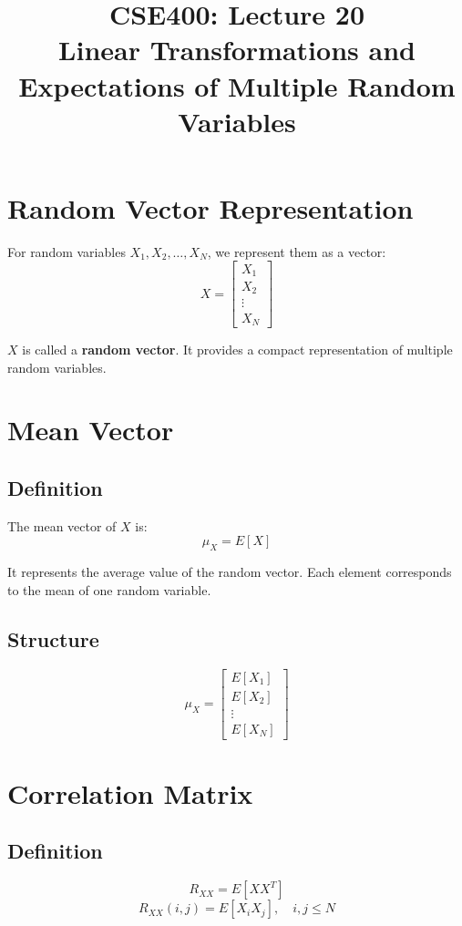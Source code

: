 \documentclass[12pt]{article}
\title{CSE400: Lecture 20 \\ Linear Transformations and Expectations of Multiple Random Variables}
\author{}
\date{}
\begin{document}
\maketitle

\section{Random Vector Representation}

For random variables $X_1, X_2, \ldots, X_N$, we represent them as a vector:
\[
X =
\begin{bmatrix}
X_1 \\
X_2 \\
\vdots \\
X_N
\end{bmatrix}
\]

$X$ is called a \textbf{random vector}. It provides a compact representation of multiple random variables.

\section{Mean Vector}

\subsection{Definition}
The mean vector of $X$ is:
\[
\mu_X = E[X]
\]

It represents the average value of the random vector. Each element corresponds to the mean of one random variable.

\subsection{Structure}
\[
\mu_X =
\begin{bmatrix}
E[X_1] \\
E[X_2] \\
\vdots \\
E[X_N]
\end{bmatrix}
\]

\section{Correlation Matrix}

\subsection{Definition}
\[
R_{XX} = E[XX^T]
\]
\[
R_{XX}(i,j) = E[X_i X_j], \quad i,j \leq N
\]
\end{document}
